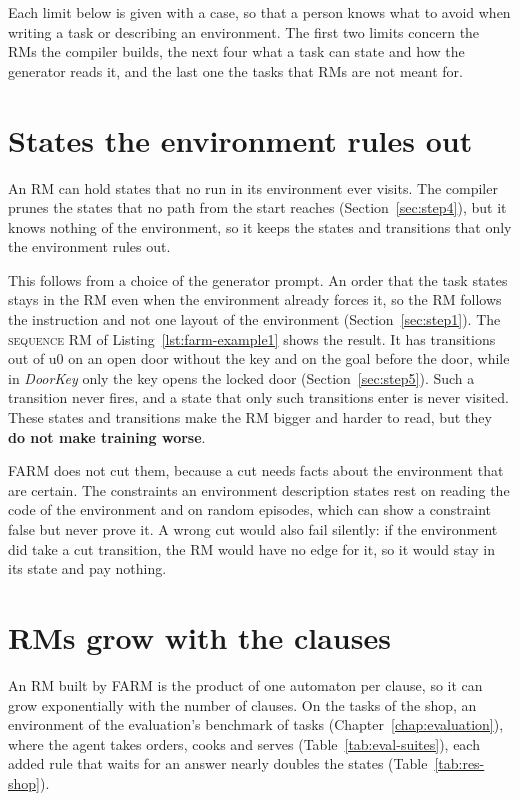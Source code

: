 \documentclass[11pt,english,listoffigures,listoftables]{tfgetsinf}
\newcommand{\runex}[1]{\textsc{#1}}  %
\newcommand{\env}[1]{\textsf{\slshape #1}}  %
\begin{document}
Each limit below is given with a case, so that a person knows what to avoid when writing a task or describing an environment. The first two limits concern the RMs the compiler builds, the next four what a task can state and how the generator reads it, and the last one the tasks that RMs are not meant for.

\section{States the environment rules out}
\label{sec:lim-impossible}
An RM can hold states that no run in its environment ever visits. The compiler prunes the states that no path from the start reaches (Section~\ref{sec:step4}), but it knows nothing of the environment, so it keeps the states and transitions that only the environment rules out.

This follows from a choice of the generator prompt. An order that the task states stays in the RM even when the environment already forces it, so the RM follows the instruction and not one layout of the environment (Section~\ref{sec:step1}). The \runex{sequence} RM of Listing~\ref{lst:farm-example1} shows the result. It has transitions out of u0 on an open door without the key and on the goal before the door, while in \env{DoorKey} only the key opens the locked door (Section~\ref{sec:step5}). Such a transition never fires, and a state that only such transitions enter is never visited. These states and transitions make the RM bigger and harder to read, but they \textbf{do not make training worse}.

FARM does not cut them, because a cut needs facts about the environment that are certain. The constraints an environment description states rest on reading the code of the environment and on random episodes, which can show a constraint false but never prove it. A wrong cut would also fail silently: if the environment did take a cut transition, the RM would have no edge for it, so it would stay in its state and pay nothing.

\section{RMs grow with the clauses}
\label{sec:lim-size}
An RM built by FARM is the product of one automaton per clause, so it can grow exponentially with the number of clauses. On the tasks of the shop, an environment of the evaluation's benchmark of tasks (Chapter~\ref{chap:evaluation}), where the agent takes orders, cooks and serves (Table~\ref{tab:eval-suites}), each added rule that waits for an answer nearly doubles the states (Table~\ref{tab:res-shop}). 
\end{document}
